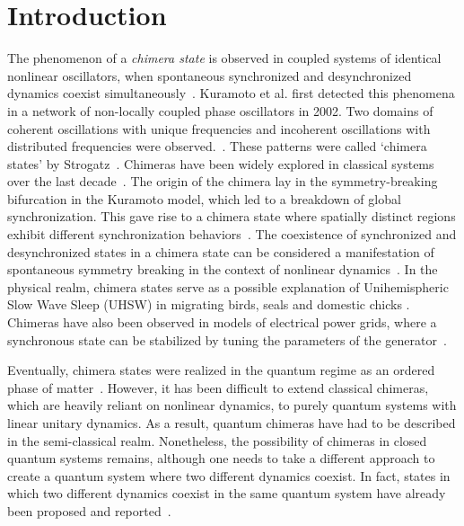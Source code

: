 \documentclass[12pt]{iopart}
\begin{document}
\section{\label{sec:intro} Introduction}
The phenomenon of a \textit{ chimera state} is observed in coupled systems of  identical nonlinear oscillators, when spontaneous synchronized and desynchronized dynamics coexist simultaneously~\cite{kuramoto_coexistence_2002, panaggio_chimera_2015}. Kuramoto et al. first detected this phenomena in a network of non-locally coupled phase oscillators in 2002. Two domains of coherent oscillations with unique frequencies and incoherent oscillations with distributed frequencies were observed.~\cite{kuramoto_coexistence_2002}. These patterns were called ‘chimera states’ by Strogatz~\cite{chimera:strogatz}. Chimeras have been widely explored in classical systems over the last decade~\cite{parastesh_chimeras_2021,chimera_book, taniya2022}. The origin of the chimera lay in the symmetry-breaking bifurcation in the Kuramoto model, which led to a breakdown of global synchronization. This gave rise to a chimera state where spatially distinct regions exhibit different synchronization behaviors~\cite{Kotwal2017}. The coexistence of synchronized and desynchronized states in a chimera state can be considered a manifestation of spontaneous symmetry breaking in the context of nonlinear dynamics~\cite{Aneta2013}. In the physical realm, chimera states serve as a possible explanation of Unihemispheric Slow Wave Sleep (UHSW) in migrating birds, seals and domestic chicks \cite{Rattenborg2000, Rattenborg2006, Rattenborg2016}. 
Chimeras have also been observed in models of electrical power grids, where a synchronous state can be stabilized by tuning the parameters of the generator~\cite{Deng_2024, Motter2013}. 

Eventually, chimera states were realized in the quantum regime as an ordered phase of matter~\cite{bastidas_quantum_2015}. However, it has been difficult to extend classical chimeras, which are heavily reliant on nonlinear dynamics, to purely quantum systems with linear unitary dynamics. As a result, quantum chimeras have had to be described in the semi-classical realm. Nonetheless, the possibility of chimeras in closed quantum systems remains, although one needs to take a different approach to create a quantum system where two different dynamics coexist. In fact, states in which two different dynamics coexist in the same quantum system have already been proposed and reported~\cite{Bastidas2018, Zha2020, sakurai_phys_nodate}.
\end{document}
